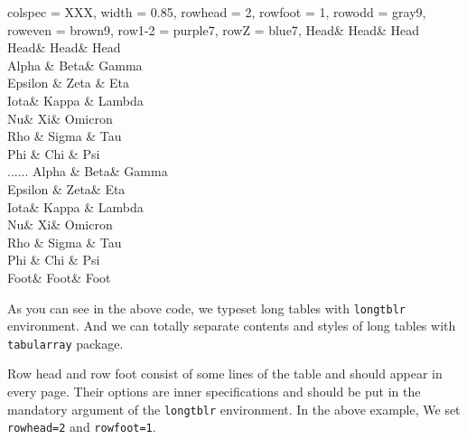 \documentclass[oneside]{book}
\begin{document}
\begin{codehigh}
\begin{longtblr}[
theme = fancy,
caption = {A Long Long Long Long Long Long Long Table},
entry = {Short Caption},
label = {tblr:test},
note{a} = {It is the first footnote.},
note{$\dag$} = {It is the second long long long long long long footnote.},
remark{Note} = {Some general note. Some general note. Some general note.},
remark{Source} = {Made up by myself. Made up by myself. Made up by myself.},
]{
colspec = {XXX}, width = 0.85\linewidth,
rowhead = 2, rowfoot = 1,
row{odd} = {gray9}, row{even} = {brown9},
row{1-2} = {purple7}, row{Z} = {blue7},
}
\hline
 Head& Head& Head\\
\hline
 Head& Head& Head\\
\hline
 Alpha & Beta& Gamma \\
\hline
 Epsilon & Zeta & Eta\\
\hline
 Iota& Kappa\TblrNote{$\dag$} & Lambda \\
\hline
 Nu& Xi& Omicron \\
\hline
 Rho & Sigma & Tau \\
\hline
 Phi & Chi & Psi \\
\hline
......
\hline
 Alpha & Beta& Gamma \\
\hline
 Epsilon & Zeta& Eta \\
\hline
 Iota& Kappa & Lambda\\
\hline
 Nu& Xi& Omicron \\
\hline
 Rho & Sigma & Tau \\
\hline
 Phi & Chi & Psi \\
\hline
 Foot& Foot& Foot\\
\hline
\end{longtblr}
\end{codehigh}

As you can see in the above code, we typeset long tables with \verb!longtblr! environment.
And we can totally separate contents and styles of long tables with \verb!tabularray! package.

Row head and row foot consist of some lines of the table and should appear in every page.
Their options are inner specifications and should be put in the mandatory argument of the \verb!longtblr! environment.
In the above example, We set \verb!rowhead=2! and \verb!rowfoot=1!.
\end{document}
